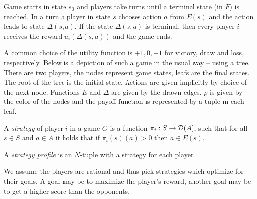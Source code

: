 Game starts in state $s_0$ and players take turns until
a terminal state (in $F$) is reached. In a turn a player in state $s$
chooses action $a$ from $E(s)$ and the action leads to state
$\Delta(s,a)$.  If the state $\Delta(s,a)$ is terminal, then every
player $i$ receives the reward $u_i(\Delta(s,a))$ and the game ends.

\begin{example}
A common choice of the utility function is $+1, 0, -1$ for victory, draw
and loss, respectively. Below is a depiction of such a game
in the usual way -- using a tree.
There are two players,
the nodes represent game states, leafs are the final states.
The root of the tree is the initial state.
Actions are given implicitly by choice of the next node.
Functions $E$ and $\Delta$ are given by the drawn edges.
$\rho$ is given by the color of the nodes
and the payoff function is represented by a tuple in each leaf.

\begin{center}
\end{center}
\end{example}


\begin{definition}
    A {\em strategy} of player $i$ in a game $G$ is a function
    $\pi_i : S \to \mathcal{D}(A)$, such that for all $s \in S$ and $a
    \in A$ it holds that if $\pi_i(s)(a) > 0$ then $a \in E(s)$.

    A {\em strategy profile} is an $N$-tuple with a strategy for each player.
\end{definition}

We assume the players are rational and thus pick strategies which
optimize for their goals. A goal may be to maximize the player's reward,
another goal may be to get a higher score than the opponents.

\pagebreak

